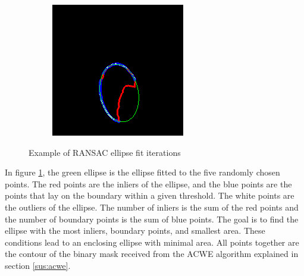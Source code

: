 \begin{figure}[h]
\begin{subfigure}{0.3\textwidth}
    \end{subfigure}%
    \hfill
    \begin{subfigure}{0.3\textwidth}
        \centering
        \includegraphics[width=0.9\linewidth]{plots/ransac/test_mask112.png}

    \end{subfigure}%
    \caption{Example of RANSAC ellipse fit iterations}
    \label{fig:RANSAC_it}
\end{figure}
In figure \ref{fig:RANSAC_it}, the green ellipse is the ellipse fitted to the five randomly chosen points. The red points are the inliers of the ellipse, and the blue points are the points that lay on the boundary within a given threshold. The white points are the outliers of the ellipse. The number of inliers is the sum of the red points and the number of boundary points is the sum of blue points. The goal is to find the ellipse with the most inliers, boundary points, and smallest area. These conditions lead to an enclosing ellipse with minimal area. All points together are the contour of the binary mask received from the ACWE algorithm explained in section \ref{sus:acwe}.
\newpage
